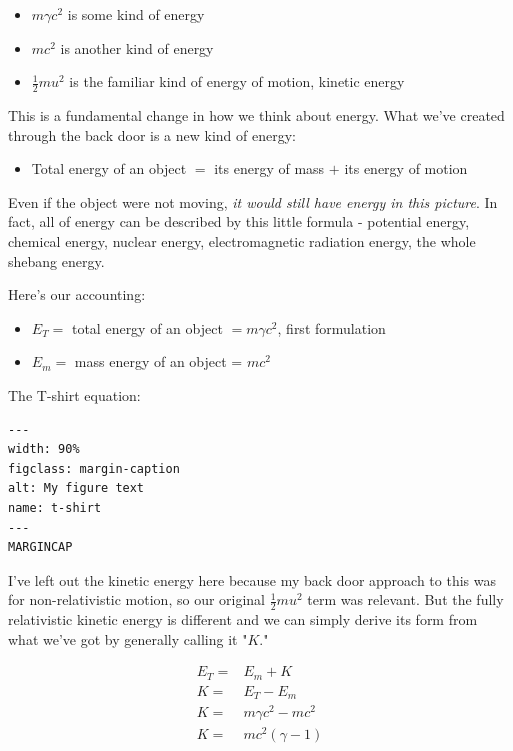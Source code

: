 \documentclass[
]{article}
\begin{document}
\begin{itemize}
\item
  \(m\gamma c^2\) is some kind of energy
\item
  \(mc^2\) is another kind of energy
\item
  \(\frac{1}{2}mu^2\) is the familiar kind of energy of motion, kinetic
  energy
\end{itemize}

This is a fundamental change in how we think about energy. What we've
created through the back door is a new kind of energy:

\begin{itemize}
\item
  Total energy of an object \(=\) its energy of mass \(+\) its energy of
  motion
\end{itemize}

Even if the object were not moving, \emph{it would still have energy in
this picture}. In fact, all of energy can be described by this little
formula - potential energy, chemical energy, nuclear energy,
electromagnetic radiation energy, the whole shebang energy.

Here's our accounting:

\begin{itemize}
\item
  \(E_T =\) total energy of an object \(= m\gamma c^2\), first
  formulation
\item
  \(E_m =\) mass energy of an object = \(mc^2\)
\end{itemize}

The T-shirt equation:

\begin{verbatim}
---
width: 90%
figclass: margin-caption
alt: My figure text
name: t-shirt
---
MARGINCAP
\end{verbatim}

I've left out the kinetic energy here because my back door approach to
this was for non-relativistic motion, so our original
\(\frac{1}{2}mu^2\) term was relevant. But the fully relativistic
kinetic energy is different and we can simply derive its form from what
we've got by generally calling it "\(K\)."

\begin{align*}
E_T =& E_m + K \\
K =& E_T - E_m \\
K =& m\gamma c^2 - mc^2 \\
K =& mc^2(\gamma -1)
\end{align*}
\end{document}
